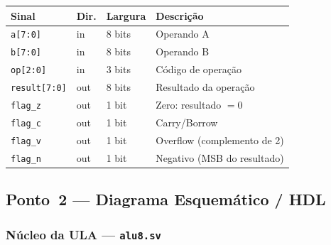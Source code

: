 \documentclass[12pt,a4paper]{article}
\begin{document}
\begin{specbox}
\begin{tabular}{lllp{6cm}}
\textbf{Sinal}    & \textbf{Dir.} & \textbf{Largura} & \textbf{Descri\c{c}\~{a}o} \\
\hline
\texttt{a[7:0]}   & in  & 8 bits & Operando A \\
\texttt{b[7:0]}   & in  & 8 bits & Operando B \\
\texttt{op[2:0]}  & in  & 3 bits & C\'{o}digo de opera\c{c}\~{a}o \\
\texttt{result[7:0]} & out & 8 bits & Resultado da opera\c{c}\~{a}o \\
\texttt{flag\_z}  & out & 1 bit  & Zero: resultado $= 0$ \\
\texttt{flag\_c}  & out & 1 bit  & Carry/Borrow \\
\texttt{flag\_v}  & out & 1 bit  & Overflow (complemento de 2) \\
\texttt{flag\_n}  & out & 1 bit  & Negativo (MSB do resultado) \\
\end{tabular}
\end{specbox}

\subsection{Ponto~2 --- Diagrama Esquem\'{a}tico / HDL}
\label{sec:esquematico}

\subsubsection{N\'{u}cleo da ULA --- \texttt{alu8.sv}}
\end{document}
